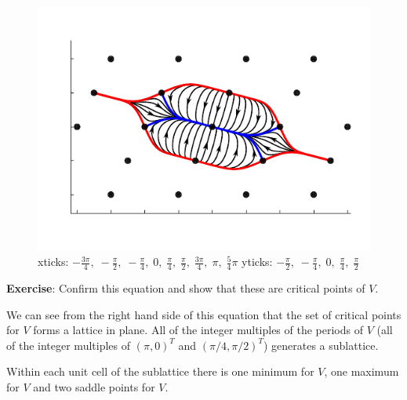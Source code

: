 \begin{figure}[ht]
\centering
\includegraphics[scale=1.20]{./images/Gradient5.pdf}
\caption{xticks: \; $\displaystyle{-\frac{3\pi}{4}, \; -\frac{\pi}{2},\;  
-\frac{\pi}{4}, \; 0, \; \frac{\pi}{4}, \; \frac{\pi}{2}, \; \frac{3\pi}{4}, \; 
\pi, \; \frac{5}{4} \pi}$ \qquad
yticks: \; $\displaystyle{-\frac{\pi}{2}, \; -\frac{\pi}{4}, \; 0, \; 
\frac{\pi}{4}, \; \frac{\pi}{2}}$}
\end{figure}

\bigskip

\noindent
{\bf Exercise}: Confirm this equation and show that these are critical points 
of $V$.

\bigskip

   We can see from the right hand side of this equation that the set of 
critical points for $V$ forms a lattice in plane.  All of the integer multiples 
of the periods of $V$ (all of the integer multiples of $(\pi,0)^T$ and $(\pi/4, 
\pi/2)^T$) generates a sublattice.

   Within each unit cell of the sublattice there is one minimum for $V$, one 
maximum for $V$ and two saddle points for $V$.


